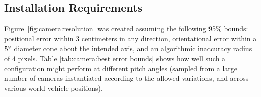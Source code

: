 \documentclass[a4paper,12pt,twoside,openright]{report}
\begin{document}
\subsection{Installation Requirements}

Figure~\ref{fig:camera:resolution} was created assuming the following 95\% bounds: positional error
within 3 centimeters in any direction, orientational error within a
$5\degree$ diameter cone about the intended axis, 
and an algorithmic inaccuracy radius of 4 pixels. Table \ref{tab:camera:best error bounds}
shows how well such a configuration might perform at different pitch angles (sampled from
a large number of cameras instantiated according to the allowed variations,
and across various world vehicle positions). 


\end{document}
